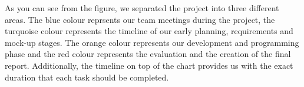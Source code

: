 \documentclass[12pt]{article}
\begin{document}
As you can see from the figure, we separated the project into three different areas. The blue colour reprsents our team meetings during the project, the turquoise colour represents the timeline of our early planning, requirements and mock-up stages. The orange colour represents our development and programming phase and the red colour represents the evaluation and the creation of the final report. Additionally, the timeline on top of the chart provides us with the exact duration that each task should be completed. 
\end{document}
